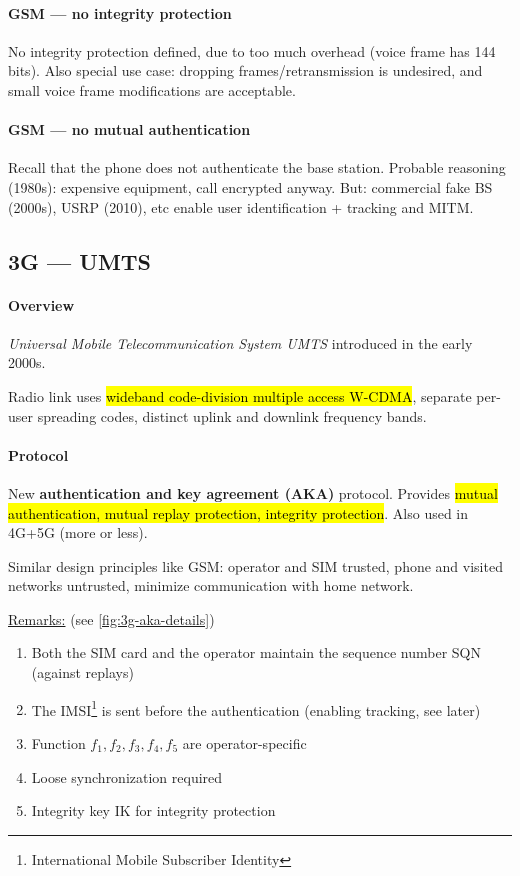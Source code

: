 \paragraph{GSM --- no integrity protection}
No integrity protection defined, due to too much overhead (voice frame has 144
bits). Also special use case: dropping frames/retransmission is undesired, and
small voice frame modifications are acceptable.

\paragraph{GSM --- no mutual authentication}
Recall that the phone does not authenticate the base station. Probable
reasoning (1980s): expensive equipment, call encrypted anyway. But: commercial
fake BS (2000s), USRP (2010), etc enable user identification + tracking and
MITM.

\subsection{3G --- UMTS}

\paragraph{Overview}
\textit{Universal Mobile Telecommunication System UMTS} introduced in the early 2000s.

Radio link uses \hl{wideband code-division multiple access W-CDMA},
separate per-user spreading codes, distinct uplink and downlink frequency
bands.

\paragraph{Protocol}
New \textbf{authentication and key agreement (AKA)} protocol. Provides \hl{mutual
	authentication, mutual replay protection, integrity protection}. Also used in
4G+5G (more or less).

Similar design principles like GSM: operator and SIM trusted, phone and visited
networks untrusted, minimize communication with home network.

\underline{Remarks:} (see \autoref{fig:3g-aka-details})
\begin{enumerate}
	\item Both the SIM card and the operator maintain the sequence number SQN (against
	      replays)
	\item The IMSI\footnote{International Mobile Subscriber Identity} is sent before the
	      authentication (enabling tracking, see later)
	\item Function $f_1, f_2, f_3, f_4, f_5$ are operator-specific
	\item Loose synchronization required
	\item Integrity key IK for integrity protection
\end{enumerate}


